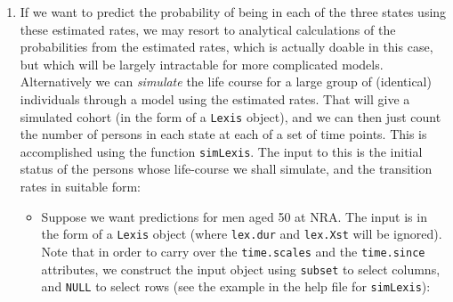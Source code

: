 \documentclass[
]{book}
\newenvironment{Shaded}{\begin{snugshade}}{\end{snugshade}}
\newcommand{\AttributeTok}[1]{\textcolor[rgb]{0.13,0.29,0.53}{#1}}
\newcommand{\ConstantTok}[1]{\textcolor[rgb]{0.56,0.35,0.01}{#1}}
\newcommand{\FunctionTok}[1]{\textcolor[rgb]{0.13,0.29,0.53}{\textbf{#1}}}
\newcommand{\NormalTok}[1]{#1}
\providecommand{\tightlist}{%
  \setlength{\itemsep}{0pt}\setlength{\parskip}{0pt}}
\theoremstyle{definition}
\theoremstyle{definition}
\theoremstyle{definition}
\theoremstyle{definition}
\theoremstyle{remark}
\begin{document}
\begin{enumerate}
\begin{verbatim}
R-sq.(adj) =  -5.65e-06   Deviance explained = 1.65%
UBRE = -0.96024  Scale est. = 1         n = 9952
\end{verbatim}

\begin{Shaded}
\begin{Highlighting}[]
\FunctionTok{ci.exp}\NormalTok{(mr, }\AttributeTok{pval =} \ConstantTok{TRUE}\NormalTok{)}
\end{Highlighting}
\end{Shaded}

\begin{verbatim}
             exp(Est.)       2.5%      97.5%            P
(Intercept) 0.02466174 0.01486718 0.04090901 1.254019e-46
sexF        2.60620470 1.25503844 5.41202779 1.019130e-02
s(tfi).1    1.00499489 0.89131271 1.13317662 9.351638e-01
s(tfi).2    0.99623769 0.80778743 1.22865188 9.718940e-01
s(tfi).3    0.99822247 0.91911268 1.08414140 9.663137e-01
s(tfi).4    1.00188999 0.89006998 1.12775801 9.750528e-01
s(tfi).5    0.99842904 0.92280785 1.08024715 9.687920e-01
s(tfi).6    0.99817367 0.90142303 1.10530865 9.719666e-01
s(tfi).7    1.00168704 0.92615949 1.08337380 9.663850e-01
s(tfi).8    0.99448155 0.68445450 1.44493689 9.768400e-01
s(tfi).9    0.94790052 0.63349476 1.41834700 7.946918e-01
\end{verbatim}

  What is the remission rate-ratio between men and women?
\item
  If we want to predict the probability of being in each of the
  three states using these estimated rates, we may resort to
  analytical calculations of the probabilities from the estimated
  rates, which is actually doable in this case, but which will be largely
  intractable for more complicated models.
  Alternatively we can \emph{simulate} the life course for a large
  group of (identical) individuals through a model using the estimated
  rates. That will give a simulated cohort (in the form of a
  \texttt{Lexis} object), and we can then just count the number of
  persons in each state at each of a set of time points.
  This is accomplished using the function \texttt{simLexis}. The input
  to this is the initial status of the persons whose life-course we
  shall simulate, and the transition rates in suitable form:

  \begin{itemize}
  \tightlist
  \item
    Suppose we want predictions for men aged 50 at
    NRA. The input is in the form of a \texttt{Lexis} object (where
    \texttt{lex.dur} and \texttt{lex.Xst} will be ignored). Note that in
    order to carry over the \texttt{time.scales} and the
    \texttt{time.since} attributes, we construct the input object using
    \texttt{subset} to select columns, and \texttt{NULL} to select rows
    (see the example in the help file for \texttt{simLexis}):
  \end{itemize}


\end{enumerate}
\end{document}

